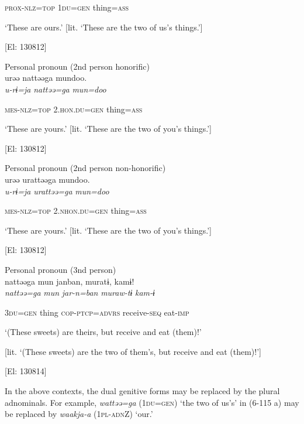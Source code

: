       \textsc{prox}-\textsc{nlz}=\textsc{top}  1\textsc{du}=\textsc{gen}  thing=\textsc{ass}

\glt ‘These are ours.’ [lit. ‘These are the two of us’s things.’]

      [El: 130812]

 \ex Personal pronoun (2nd person honorific)\\
{\TM}
\gll  urəə  nattəəga  mundoo.\\

      \textit{u-rɨ=ja}  \textit{nattəə=ga}  \textit{mun=doo}

      \textsc{mes}-\textsc{nlz}=\textsc{top}  2.\textsc{hon}.\textsc{du}=\textsc{gen}  thing=\textsc{ass}

\glt ‘These are yours.’ [lit. ‘These are the two of you’s things.’]

      [El: 130812]

 \ex Personal pronoun (2nd person non-honorific)\\
{\TM}
\gll  urəə  urattəəga  mundoo.\\

      \textit{u-rɨ=ja}  \textit{urattəə=ga}  \textit{mun=doo}

      \textsc{mes}-\textsc{nlz}=\textsc{top}  2.\textsc{nhon}.\textsc{du}=\textsc{gen}  thing=\textsc{ass}

\glt ‘These are yours.’ [lit. ‘These are the two of you’s things.’]

      [El: 130812]

 \ex Personal pronoun (3nd person)\\
{\TM}
\gll  nattəəga  mun  janban,  muratɨ,  kamɨ!\\

      \textit{nattəə=ga}  \textit{mun}  \textit{jar-n=ban}  \textit{muraw-tɨ}  \textit{kam-ɨ}

      3\textsc{du}=\textsc{gen}  thing  \textsc{cop}-\textsc{ptcp}=\textsc{advrs}  receive-\textsc{seq}  eat-\textsc{imp}

\glt ‘(These sweets) are theirs, but receive and eat (them)!’

[lit. ‘(These sweets) are the two of them’s, but receive and eat (them)!’]

      [El: 130814]

In the above contexts, the dual genitive forms may be replaced by the plural adnominals. For example, \textit{wattəə=ga} (1\textsc{du}=\textsc{gen}) ‘the two of us’s’ in (6-115 a) may be replaced by \textit{waakja-a} (1\textsc{pl}-\textsc{adn}Z) ‘our.’

